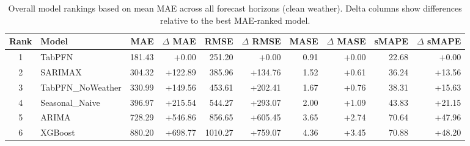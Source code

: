\begin{table}[ht!]
\centering
\begin{tabular}{clrrrrrrrr}
\toprule
Rank & Model & MAE & \(\Delta\) MAE & RMSE & \(\Delta\) RMSE & MASE & \(\Delta\) MASE & sMAPE & \(\Delta\) sMAPE \\
\midrule
1 & TabPFN & 181.43 & +0.00 & 251.20 & +0.00 & 0.91 & +0.00 & 22.68 & +0.00 \\
2 & SARIMAX & 304.32 & +122.89 & 385.96 & +134.76 & 1.52 & +0.61 & 36.24 & +13.56 \\
3 & TabPFN_NoWeather & 330.99 & +149.56 & 453.61 & +202.41 & 1.67 & +0.76 & 38.31 & +15.63 \\
4 & Seasonal_Naive & 396.97 & +215.54 & 544.27 & +293.07 & 2.00 & +1.09 & 43.83 & +21.15 \\
5 & ARIMA & 728.29 & +546.86 & 856.65 & +605.45 & 3.65 & +2.74 & 70.64 & +47.96 \\
6 & XGBoost & 880.20 & +698.77 & 1010.27 & +759.07 & 4.36 & +3.45 & 70.88 & +48.20 \\
\bottomrule
\end{tabular}
\caption{Overall model rankings based on mean MAE across all forecast horizons (clean weather). Delta columns show differences relative to the best MAE-ranked model.}
\label{tab:overall_rankings}
\end{table}
